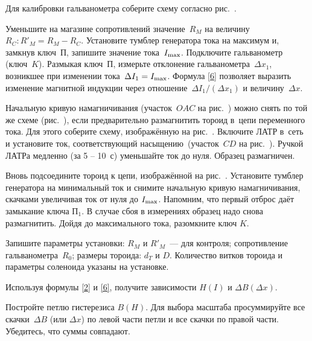 \begin{lab:task}

	\item Для калибровки гальванометра соберите схему согласно
рис.~.

	Уменьшите на магазине сопротивлений значение~$R_M$ на
	величину~$R_C: R'_M=R_M-R_C$. Установите тумблер генератора тока на максимум
и, замкнув ключ~$\text{П}$, запишите значение
	тока~$I_{\rm max}$. Подключите гальванометр (ключ~$K$). Размыкая
ключ~$\text{П}$, измерьте отклонение гальванометра~$\Delta x_1$,
	возникшее при изменении тока~$\Delta I_1=I_{\rm max}$. Формула \eqref{6}
позволяет выразить изменение магнитной индукции через
	отношение~$\Delta I_1/(\Delta x_1)$ и величину~$\Delta x$.


	\item Начальную кривую намагничивания (участок~$OAC$ на
рис.~) можно снять по той же схеме
(рис.~), если предварительно
	размагнитить тороид в~цепи переменного тока. Для этого соберите схему,
изображённую на рис.~. Включите ЛАТР в~сеть и
	установите ток, соответствующий насыщению~(участок~$CD$ на
рис.~). Ручкой ЛАТРа медленно (за 5 -- 10~с)
уменьшайте ток до
	нуля. Образец размагничен.

	\item Вновь подсоедините тороид к цепи, изображённой на рис.~. Установите тумблер генератора на минимальный ток и
снимите  начальную кривую намагничивания,  скачками увеличивая ток от нуля до
$I_{\rm max}$. Напомним, что первый отброс даёт замыкание ключа $\text{П}_1$.  В
случае сбоя в измерениях образец надо снова размагнитить.
	Дойдя до максимального тока,  разомкните ключ $K$.

	\item Запишите параметры установки: $R_M$ и $R'_M$~--- для контроля;
сопротивление гальванометра~$R_0$; размеры тороида:
	$d_T$ и $D$. Количество витков тороида и параметры соленоида указаны на
установке.


		\item Используя формулы \eqref{2} и \eqref{6}, получите зависимости
        $H(I)$ и $\Delta B(\Delta x)$.

		\item Постройте петлю гистерезиса $B(H)$. Для выбора масштаба
просуммируйте все скачки~$\Delta B$ (или $\Delta x$) по левой части
		петли и все скачки по правой части. Убедитесь, что суммы совпадают.


\end{lab:task}
